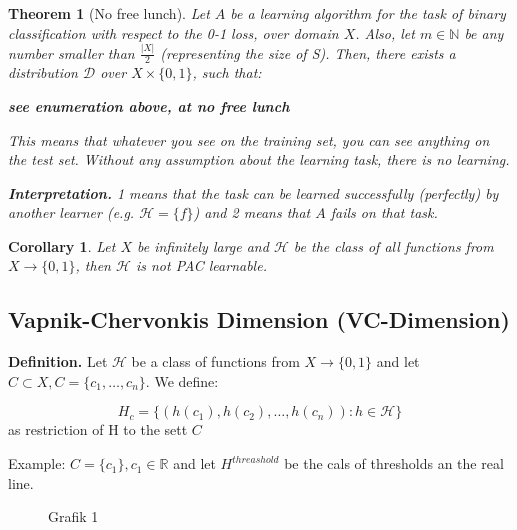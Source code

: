 \documentclass{scrarticle}
\newtheorem{theorem}{Theorem}[section]
\newtheorem{corollary}{Corollary}[theorem]
\begin{document}
\begin{theorem}[No free lunch]
\label{theo:nofreelunch}
Let $A$ be a learning algorithm for the task of binary classification with respect to the 0-1 loss, over domain $X$. Also, let $m \in \mathbb{N}$ be any number smaller than $\tfrac{|X|}{2}$ (representing the size of S). Then, there exists a distribution $\mathcal{D}$ over $X \times \{0,1\}$, such that: 

\textbf{see enumeration above, at no free lunch}


This means that whatever you see on the training set, you can see anything on the test set. Without any assumption about the learning task, there is no learning. 

\medskip

\textbf{Interpretation.} 1 means that the task can be learned successfully (perfectly) by another learner (e.g. $\mathcal{H}=\{f\}$) and 2 means that $A$ fails on that task.

\end{theorem}

\begin{corollary}
Let $X$ be infinitely large and $\mathcal{H}$ be the class of all functions from $X \to \{0,1\}$, then $\mathcal{H}$ is not PAC learnable.
\end{corollary}

\subsection{Vapnik-Chervonkis Dimension (VC-Dimension)}

\textbf{Definition.} Let $\mathcal{H}$ be a class of functions from $X \to \{0,1\}$ and let $C \subset X, C=\{c_1, \ldots, c_n\}$. We define: 

\begin{equation*}
    H_c = \Big\{(h(c_1), h(c_2), \ldots , h(c_n)): h \in \mathcal{H} \Big \}
\end{equation*}
as restriction of H to the sett $C$

Example: $C=\{c_1\}, c_1 \in \mathbb{R}$ and let $H^{threashold}$ be the cals of thresholds an the real line. 

\begin{figure}[ht]
    \centering
    \caption{Grafik 1}
    \label{fig:R-space}
\end{figure}
\end{document}
